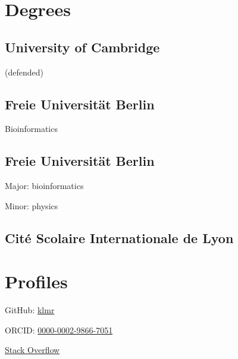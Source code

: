 \documentclass{klmr-cv}
\author{Konrad Rudolph}
\begin{document}
\maketitle

\sidebar

\section{Degrees}

\subsection{University of Cambridge}

\date{2015}
\item{ (defended)}

\subsection{Freie Universität Berlin}

\date{2011}
\item{}
\item{Bioinformatics}

\subsection{Freie Universität Berlin}

\date{2008}
\item{}
\item{Major: bioinformatics}
\item{Minor: physics}

\subsection{\textfrench{Cité Scolaire Internationale de Lyon}}

\date{2003}
\item{}

\section{Profiles}

\item{GitHub: \href{http://github.com/klmr}{klmr}}
\item{ORCID: \href{http://orcid.org/0000-0002-9866-7051}{0000-0002-9866-7051}}
\item{\href{http://stackoverflow.com/users/1968/konrad-rudolph}{Stack Overflow}}
\end{document}
